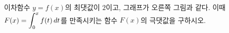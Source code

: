 \noindent\begin{minipage}[t]{0.58\linewidth}\vspace{0pt}\raggedright 이차함수 $y=f(x)$의 최댓값이 $2$이고, 그래프가 오른쪽 그림과 같다. 이때 $F(x)=\displaystyle\int_{0}^{x} f(t)\mkern3mu dt$를 만족시키는 함수 $F(x)$의 극댓값을 구하시오.\end{minipage}\hfill\begin{minipage}[t]{0.4\linewidth}\vspace{0pt}\centering \resizebox{\ifdim\width>\linewidth\linewidth\else\width\fi}{!}{}\end{minipage}\par
